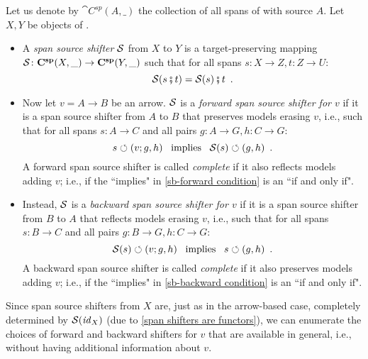 \begin{definition}
Let us denote by $\cat{C^{sp}}(A,\_)$ the collection of all spans of  with source $A$. Let $X,Y$ be objects of . 
\begin{itemize}[topsep=\smallskipamount]
\item A \emph{span source shifter} $\mathcal{S}$ from $X$ to $Y$ is a target-preserving mapping $\mathcal{S} \colon \mathbf{C^{sp}}(X,\_) \rightarrow \mathbf{C^{sp}}(Y, \_)$
such that for all spans $s:X\to Z,t:Z\to U$:
%
\begin{equation}\eqlabel{span shifters are functors}
\cS(s \spcomp t) = \cS(s)\spcomp t \enspace.
\end{equation}
%
\item Now let $v=A\to B$ be an arrow. $\mathcal{S}$ is a \emph{forward span source shifter for $v$} if it is a span source shifter from $A$ to $B$ that preserves models erasing $v$, i.e., such that for all spans $s:A\to C$ and all pairs $g:A\to G,h:C \to G$:
%
\begin{equation}\eqlabel{sb-forward condition}
s\commutes (v;g,h) \enspace\text{ implies }\enspace \cS(s) \commutes (g,h) \enspace.
\end{equation}
%
A forward span source shifter is called \emph{complete} if it also reflects models adding $v$; i.e., if the ``implies" in \eqref{sb-forward condition} is an ``if and only if".

\item Instead, $\mathcal{S}$ is a \emph{backward span source shifter for $v$} if it is a span source shifter from $B$ to $A$ that reflects models erasing $v$, i.e., such that for all spans $s:B\to C$ and all pairs $g:B\to G,h:C\to G$:
%
\begin{equation}\eqlabel{sb-backward condition}
\cS(s) \commutes (v;g,h) \enspace\text{ implies }\enspace s\commutes (g,h) \enspace.
\end{equation}
%
A backward span source shifter is called \emph{complete} if it also preserves models adding $v$; i.e., if the ``implies" in \eqref{sb-backward condition} is an ``if and only if".
\end{itemize}
\end{definition}
%
Since span source shifters from $X$ are, just as in the arrow-based case, completely determined by $\mathcal{S}(\mathit{id}_X)$ (due to \eqref{span shifters are functors}), we can enumerate the choices of forward and backward shifters for $v$ that are available in general, i.e., without having additional information about $v$.
%
